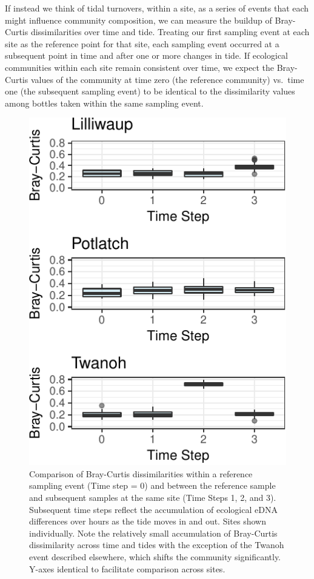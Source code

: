 \documentclass[fleqn,10pt,lineno]{wlpeerj} %
\begin{document}
If instead we think of tidal turnovers, within a site, as a series of
events that each might influence community composition, we can measure
the buildup of Bray-Curtis dissimilarities over time and tide. Treating
our first sampling event at each site as the reference point for that
site, each sampling event occurred at a subsequent point in time and
after one or more changes in tide. If ecological communities within each
site remain consistent over time, we expect the Bray-Curtis values of
the community at time zero (the reference community) vs.~time one (the
subsequent sampling event) to be identical to the dissimilarity values
among bottles taken within the same sampling event.

\begin{figure}

{\centering \includegraphics{figures/BrayCurtis_timeSeries-1} 

}

\caption{\label{fig:TimeSeriesFigure}Comparison of Bray-Curtis dissimilarities within a reference sampling event (Time step = 0) and between the reference sample and subsequent samples at the same site (Time Steps 1, 2, and 3). Subsequent time steps reflect the accumulation of ecological eDNA differences over hours as the tide moves in and out. Sites shown individually. Note the relatively small accumulation of Bray-Curtis dissimilarity across time and tides with the exception of the Twanoh event described elsewhere, which shifts the community significantly. Y-axes identical to facilitate comparison across sites.}\label{fig:BrayCurtis_timeSeries}
\end{figure}
\end{document}
